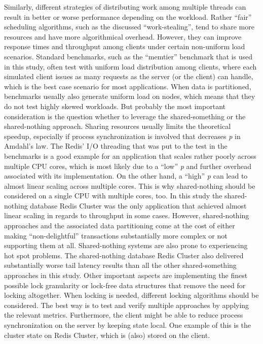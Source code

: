Similarly, different strategies of distributing work among multiple threads can result in better or worse performance depending on the workload. Rather “fair” scheduling algorithms, such as the discussed “work-stealing”, tend to share more resources and have more algorithmical overhead. However, they can improve response times and throughput among clients under certain non-uniform load scenarios.\newline
Standard benchmarks, such as the “memtier” benchmark that is used in this study, often test with uniform load distribution among clients, where each simulated client issues as many requests as the server (or the client) can handle, which is the best case scenario for most applications. When data is partitioned, benchmarks usually also generate uniform load on nodes, which means that they do not test highly skewed workloads.\newline
But probably the most important consideration is the question whether to leverage the shared-something or the shared-nothing approach. Sharing resources usually limits the theoretical speedup, especially if process synchronization is involved that decreases \textit{p} in Amdahl’s law. The Redis’ I/O threading that was put to the test in the benchmarks is a good example for an application that scales rather poorly across multiple CPU cores, which is most likely due to a “low” \textit{p} and further overhead associated with its implementation. On the other hand, a “high” \textit{p} can lead to almost linear scaling across multiple cores. This is why shared-nothing should be considered on a single CPU with multiple cores, too. In this study the shared-nothing database Redis Cluster was the only application that achieved almost linear scaling in regards to throughput in some cases. However, shared-nothing approaches and the associated data partitioning come at the cost of either making “non-delightful” transactions substantially more complex or not supporting them at all. Shared-nothing systems are also prone to experiencing hot spot problems. The shared-nothing database Redis Cluster also delivered substantially worse tail latency results than all the other shared-something approaches in this study.\newline
Other important aspects are implementing the finest possible lock granularity or lock-free data structures that remove the need for locking altogether. When locking is needed, different locking algorithms should be considered. The best way is to test and verify multiple approaches by applying the relevant metrics. Furthermore, the client might be able to reduce process synchronization on the server by keeping state local. One example of this is the cluster state on Redis Cluster, which is (also) stored on the client.\newline
